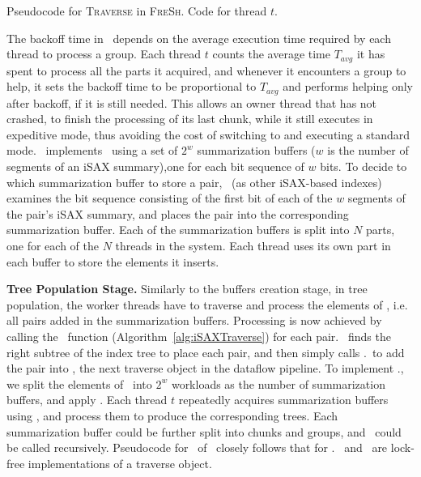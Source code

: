 \begin{algorithm}[t]
\begin{algorithmic}[1]
    \end{algorithmic}

    \caption{Pseudocode for \textsc{Traverse} in \textsc{FreSh}. Code for thread $t$.}
    \label{alg:bc}
\end{algorithm}

The backoff time in \Fresh\ depends on the average execution time required by each
thread to process a group. Each thread $\mathit{t}$ counts the average time 
$T_{avg}$ it has spent to process all the parts it acquired, and whenever
it encounters a group to help, it sets the backoff time to be proportional
to $T_{avg}$ and performs helping only after backoff, if it is still needed.
This allows an owner thread that has not crashed, to finish the processing of its last chunk,
while it still executes in expeditive mode, thus avoiding the cost of switching
to and executing a standard mode.
% 
\Fresh\ implements \TP\ using a set of $2^w$ summarization buffers
($w$ is the number of segments of an iSAX summary),one for each bit sequence of $w$ bits.
To decide to which summarization buffer to store a pair,
\Fresh\ (as other iSAX-based indexes) 
examines the bit sequence consisting of the first bit of each 
of the $w$ segments of the pair's iSAX summary, 
and places the pair into the corresponding summarization buffer. 
Each of the summarization buffers is split into $N$ parts, one for each of the $N$ threads in the system.
Each thread uses its own part in each buffer to store the elements it inserts.


\noindent
{\bf Tree Population Stage.}
Similarly to the buffers creation stage, in tree population, the worker threads
have to traverse and process the elements of \TP, i.e. all pairs added in the summarization buffers.
Processing is now achieved by calling the \TreePopulation\ function (Algorithm~\ref{alg:iSAXTraverse})
for each pair. \TreePopulation\ finds the right subtree of the index tree to place each pair, and then 
simply calls \PS.\Put\ to add the pair into \PS, the next traverse object in the dataflow pipeline. 
To implement \TP.\Traverse, we split the elements of \TP\ into $2^w$ workloads 
as the number of summarization buffers, and apply \Refresh.
Each thread $\mathit{t}$ repeatedly acquires summarization buffers using \FAI,
and process them to produce the corresponding trees. 
% 
Each summarization buffer could be further split into chunks and groups, and \Refresh\ could be called recursively.
Pseudocode for \Traverse\ of \TP\ closely follows that for \BC.
\BC\ and \TP\ are lock-free implementations of a traverse object. 

